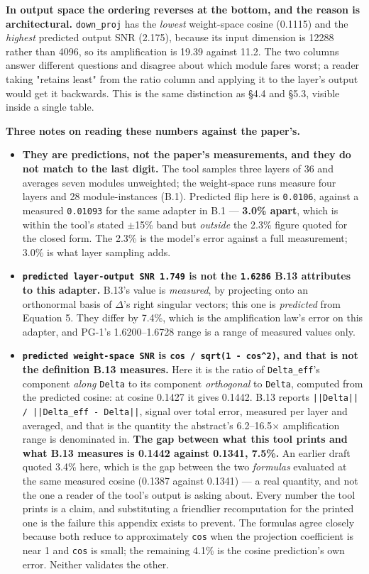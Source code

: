 \textbf{In output space the ordering reverses at the bottom, and the reason is architectural.} \texttt{down\_\allowbreak{}proj} has the \emph{lowest} weight-space cosine (0.1115) and the \emph{highest} predicted output SNR (2.175), because its input dimension is 12288 rather than 4096, so its amplification is 19.39 against 11.2. The two columns answer different questions and disagree about which module fares worst; a reader taking "retains least" from the ratio column and applying it to the layer's output would get it backwards. This is the same distinction as \S{}4.4 and \S{}5.3, visible inside a single table.

\textbf{Three notes on reading these numbers against the paper's.}

\begin{itemize}\itemsep1pt
\item \textbf{They are predictions, not the paper's measurements, and they do not match to the last digit.} The tool samples three layers of 36 and averages seven modules unweighted; the weight-space runs measure four layers and 28 module-instances (B.1). Predicted flip here is \texttt{0.\allowbreak{}0106}, against a measured \texttt{0.\allowbreak{}01093} for the same adapter in B.1 --- \textbf{3.0\% apart}, which is within the tool's stated $\pm$15\% band but \emph{outside} the 2.3\% figure quoted for the closed form. The 2.3\% is the model's error against a full measurement; 3.0\% is what layer sampling adds.
\item \textbf{\texttt{predicted layer-\allowbreak{}output SNR 1.\allowbreak{}749} is not the \texttt{1.\allowbreak{}6286} B.13 attributes to this adapter.} B.13's value is \emph{measured}, by projecting onto an orthonormal basis of $\Delta$'s right singular vectors; this one is \emph{predicted} from Equation 5. They differ by 7.4\%, which is the amplification law's error on this adapter, and PG-1's 1.6200--1.6728 range is a range of measured values only.
\item \textbf{\texttt{predicted weight-\allowbreak{}space SNR} is \texttt{cos / sqrt(1 - cos\textasciicircum{}2)}, and that is not the definition B.13 measures.} Here it is the ratio of \texttt{Delta\_\allowbreak{}eff}'s component \emph{along} \texttt{Delta} to its component \emph{orthogonal} to \texttt{Delta}, computed from the predicted cosine: at cosine 0.1427 it gives 0.1442. B.13 reports \texttt{||Delta|| / ||Delta\_\allowbreak{}eff - Delta||}, signal over total error, measured per layer and averaged, and that is the quantity the abstract's 6.2--16.5$\times$ amplification range is denominated in. \textbf{The gap between what this tool prints and what B.13 measures is 0.1442 against 0.1341, 7.5\%.} An earlier draft quoted 3.4\% here, which is the gap between the two \emph{formulas} evaluated at the same measured cosine (0.1387 against 0.1341) --- a real quantity, and not the one a reader of the tool's output is asking about. Every number the tool prints is a claim, and substituting a friendlier recomputation for the printed one is the failure this appendix exists to prevent. The formulas agree closely because both reduce to approximately \texttt{cos} when the projection coefficient is near 1 and \texttt{cos} is small; the remaining 4.1\% is the cosine prediction's own error. Neither validates the other.

\end{itemize}

